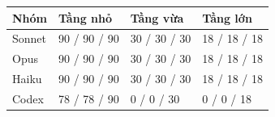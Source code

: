 \begin{tabular}{llll}
\toprule
Nhóm & Tầng nhỏ & Tầng vừa & Tầng lớn \\
\midrule
Sonnet & 90 / 90 / 90 & 30 / 30 / 30 & 18 / 18 / 18 \\
Opus & 90 / 90 / 90 & 30 / 30 / 30 & 18 / 18 / 18 \\
Haiku & 90 / 90 / 90 & 30 / 30 / 30 & 18 / 18 / 18 \\
Codex & 78 / 78 / 90 & 0 / 0 / 30 & 0 / 0 / 18 \\
\bottomrule
\end{tabular}
